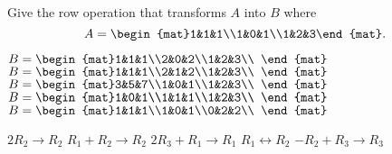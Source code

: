 

\begin{Exercise}[
name={},
title={}, 
difficulty=0,
origin={\cite{GH}}]
Give the row operation that transforms $A$ into $B$ where $$A = \begin{mat}1&1&1\\1&0&1\\1&2&3\end{mat}.$$
\begin{multicols}{2}
\Question $B = \begin{mat}1&1&1\\2&0&2\\1&2&3\\ \end{mat}$
\Question $B = \begin{mat}1&1&1\\2&1&2\\1&2&3\\ \end{mat}$
\Question $B = \begin{mat}3&5&7\\1&0&1\\1&2&3\\ \end{mat}$
\Question $B = \begin{mat}1&0&1\\1&1&1\\1&2&3\\ \end{mat}$
\Question $B = \begin{mat}1&1&1\\1&0&1\\0&2&2\\ \end{mat}$
\EndCurrentQuestion
\end{multicols}
\end{Exercise}

\begin{Answer}
\Question $2R_2\rightarrow R_2$ 
\Question $R_1+R_2\rightarrow R_2$
\Question $2R_3+R_1\rightarrow R_1$
\Question $R_1\leftrightarrow R_2$
\Question $-R_2+R_3\rightarrow R_3$

\end{Answer}
